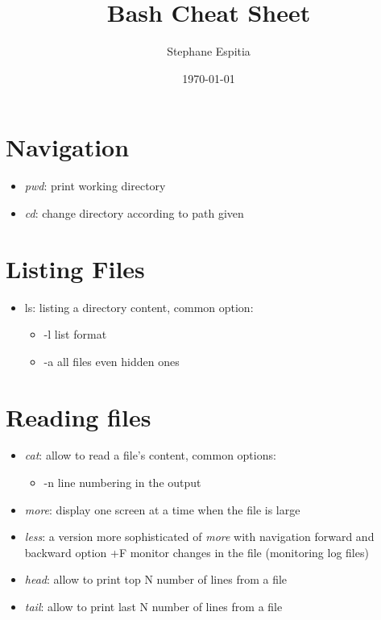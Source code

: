 \documentclass[a4paper,12pts]{article}
\begin{document}
\title{Bash Cheat Sheet}
\author{Stephane Espitia}
\date{\today}
\maketitle

\tableofcontents
\newpage
{}


\section{Navigation}
\begin{itemize}
    \item \textit{pwd}: print working directory
    \item \textit{cd}: change directory according to path given
\end{itemize}

\section{Listing Files}
\begin{itemize}
    \item ls: listing a directory content, common option: 
       \begin{itemize}
           \item -l list format
           \item -a all files even hidden ones
       \end{itemize}
\end{itemize}

\section{Reading files}
\begin{itemize}
    \item \textit{cat}: allow to read a file's content, common options:
        \begin{itemize}
            \item -n line numbering in the output
        \end{itemize}
    \item \textit{more}: display one screen at a time when the file is large
    \item \textit{less}: a version more sophisticated of \textit{more} with
        navigation forward and backward option +F monitor changes in the file
        (monitoring log files)
    \item \textit{head}: allow to print top N number of lines from a file
    \item \textit{tail}: allow to print last N number of lines from a file
\end{itemize}
\end{document}

